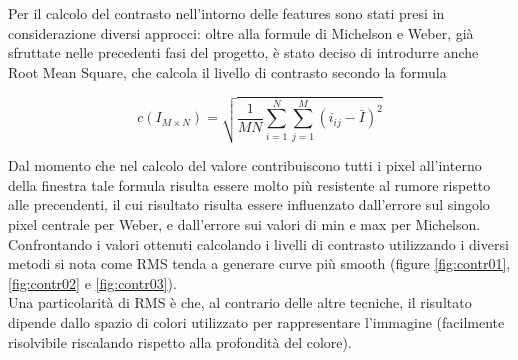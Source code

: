 \documentclass[12pt]{report}
\begin{document}
\noindent Per il calcolo del contrasto nell'intorno delle features sono stati presi in considerazione diversi approcci: oltre alla formule di Michelson e Weber, gi\`a sfruttate nelle precedenti fasi del progetto, \`e stato deciso di introdurre anche Root Mean Square, che calcola il livello di contrasto secondo la formula

$$ c\left(I_{M\times N}\right) = \sqrt{\frac{1}{MN}\sum_{i=1}^N\sum_{j=1}^M(i_{ij}-\bar{I})^2} $$

\noindent Dal momento che nel calcolo del valore contribuiscono tutti i pixel all'interno della finestra tale formula risulta essere molto pi\`u resistente al rumore rispetto alle precendenti, il cui risultato risulta essere influenzato dall'errore sul singolo pixel centrale per Weber, e dall'errore sui valori di min e max per Michelson.\\

\noindent Confrontando i valori ottenuti calcolando i livelli di contrasto utilizzando i diversi metodi si nota come RMS tenda a generare curve pi\`u smooth (figure \ref{fig:contr01}, \ref{fig:contr02} e \ref{fig:contr03}).\\

\noindent Una particolarit\`a di RMS \`e che, al contrario delle altre tecniche, il risultato dipende dallo spazio di colori utilizzato per rappresentare l'immagine (facilmente risolvibile riscalando rispetto alla profondit\`a del colore).
\end{document}
